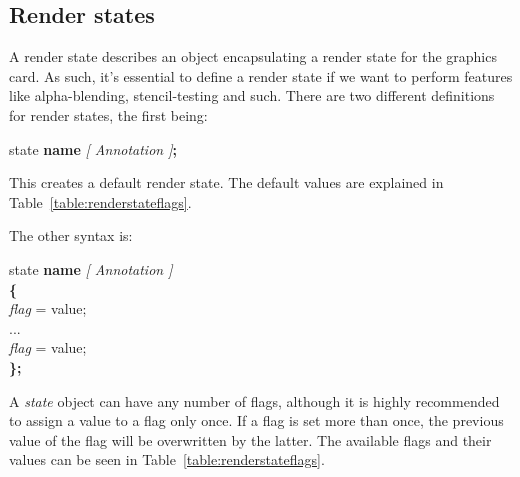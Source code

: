 \documentclass{article}
\newcommand{\SyntaxBox}[1]
{	
	\begin{center}
	\colorbox{orange!60}
	{
		\begin{minipage}{\linewidth}
		\hfill
		\begin{tabbing}
		#1
		\end{tabbing}
		\end{minipage}
	}
	\end{center}
}
\begin{document}
\subsection{Render states}
A render state describes an object encapsulating a render state for the graphics card. As such, it's essential to define a render state if we want to perform features like alpha-blending, stencil-testing and such. There are two different definitions for render states, the first being:

\begin{center}
\SyntaxBox
{
	state \textbf{name} \textit{[ Annotation ]}\textbf{;}
}
\end{center}

This creates a default render state. The default values are explained in Table~\ref{table:renderstateflags}. 

The other syntax is:

\SyntaxBox
{
		state \textbf{name} \textit{[ Annotation ]} \\
		\textbf{\{} \= \\
			\> \textit{flag} = value; \\
			\> ... \\
			\> \textit{flag} = value; \\
		\textbf{\};}
}

A \textit{state} object can have any number of flags, although it is highly recommended to assign a value to a flag only once. If a flag is set more than once, the previous value of the flag will be overwritten by the latter. The available flags and their values can be seen in Table~\ref{table:renderstateflags}.
\end{document}
